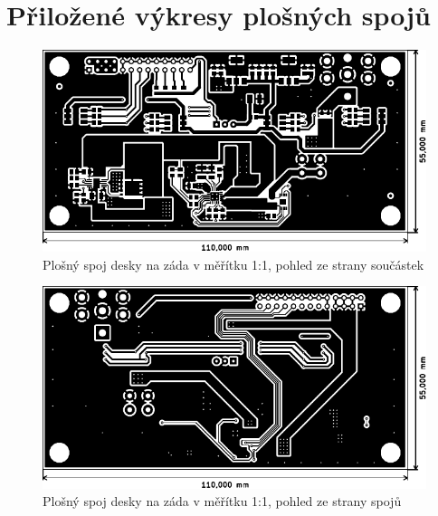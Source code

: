 \chapter{Přiložené výkresy plošných spojů}
\begin{figure}[h]
    \centering
    \includegraphics{pcb/back-top}
    \caption{Plošný spoj desky na záda v měřítku 1:1, pohled ze strany součástek}
\end{figure}
\begin{figure}[h]
    \centering
    \includegraphics{pcb/back-bot}
    \caption{Plošný spoj desky na záda v měřítku 1:1, pohled ze strany spojů}
\end{figure}

